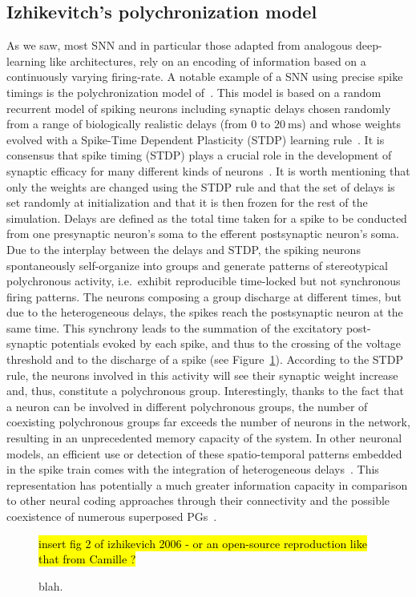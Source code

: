 \documentclass[brainsci, %
               review,submit,pdftex,moreauthors
               ]{Definitions/mdpi}
\newcommand{\ms}{\si{\milli\second}}%
\newcommand{\note}[1]{{\sethlcolor{yellow}\hl{#1}}}
\begin{document}
\subsection{Izhikevitch's polychronization model}
As we saw, most SNN and in particular those adapted from analogous deep-learning like architectures, rely on an encoding of information based on a continuously varying firing-rate. A notable example of a SNN using precise spike timings is the polychronization model of~\citet{izhikevich_polychronization_2006}. This model is based on a random recurrent model of spiking neurons including synaptic delays chosen randomly from a range of biologically realistic delays (from $0$ to $20~\ms$) and whose weights evolved with a Spike-Time Dependent Plasticity (STDP) learning rule~\citep{markram_regulation_1997}. It is consensus that spike timing (STDP) plays a crucial role in the development of synaptic efficacy for many different kinds of neurons~\citep{caporale_spike_2008}. It is worth mentioning that only the weights are changed using the STDP rule and that the set of delays is set randomly at initialization and that it is then frozen for the rest of the simulation. Delays are defined as the total time taken for a spike to be conducted from one presynaptic neuron's soma to the efferent postsynaptic neuron's soma. Due to the interplay between the delays and STDP, the spiking neurons spontaneously self-organize into groups and generate patterns of stereotypical polychronous activity, i.e.~exhibit reproducible time-locked but not synchronous firing patterns. The neurons composing a group discharge at different times, but due to the heterogeneous delays, the spikes reach the postsynaptic neuron at the same time. This synchrony leads to the summation of the excitatory post-synaptic potentials evoked by each spike, and thus to the crossing of the voltage threshold and to the discharge of a spike (see Figure~\ref{fig:PG}). According to the STDP rule, the neurons involved in this activity will see their synaptic weight increase and, thus, constitute a polychronous group. Interestingly, thanks to the fact that a neuron can be involved in different polychronous groups, the number of coexisting polychronous groups far exceeds the number of neurons in the network, resulting in an unprecedented memory capacity of the system. In other neuronal models, an efficient use or detection of these spatio-temporal patterns embedded in the spike train comes with the integration of heterogeneous delays~\citep{guise_bayesian_2014,zhang_supervised_2020}. This representation has potentially a much greater information capacity in comparison to other neural coding approaches through their connectivity and the possible coexistence of numerous superposed PGs~\citep{izhikevich_polychronous_2009}.
\begin{figure}
\centering
\note{insert fig 2 of izhikevich 2006 - or an open-source reproduction like that from Camille ? }
\caption{blah.}\label{fig:PG}
\end{figure}
\end{document}
